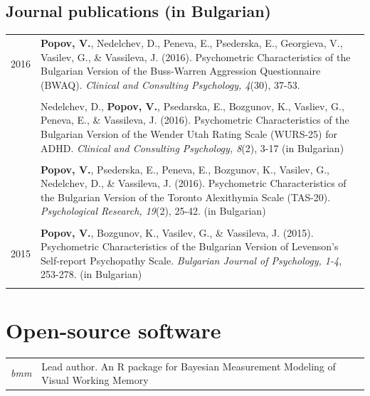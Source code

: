 \documentclass[letterpaper]{article}
\begin{document}
\subsection*{Journal publications (in Bulgarian)}
\begin{longtable}{p{0.7cm}p{15cm}}
2016 & \textbf{Popov, V.}, Nedelchev, D., Peneva, E., Psederska, E., Georgieva, V., Vasilev, G., \& Vassileva, J. (2016). Psychometric Characteristics of the Bulgarian Version of the Buss-Warren Aggression Questionnaire (BWAQ). {\it Clinical and Consulting Psychology, 4}(30), 37-53.\\[6pt]
&\\
& Nedelchev, D., \textbf{Popov, V.}, Psedarska, E., Bozgunov, K., Vasliev, G., Peneva, E., \& Vassileva, J. (2016). Psychometric Characteristics of the Bulgarian Version of the Wender Utah Rating Scale (WURS-25) for ADHD. {\it Clinical and Consulting Psychology, 8}(2), 3-17 (in Bulgarian)\\[6pt]
&\\
& \textbf{Popov, V.}, Psederska, E., Peneva, E., Bozgunov, K., Vasilev, G., Nedelchev, D., \& Vassileva, J. (2016). Psychometric Characteristics of the Bulgarian Version of the Toronto Alexithymia Scale (TAS-20). {\it Psychological Research, 19}(2), 25-42. (in Bulgarian)\\[6pt]
 &\\
2015 & \textbf{Popov, V.}, Bozgunov, K., Vasilev, G., \& Vassileva, J. (2015). Psychometric Characteristics of the Bulgarian Version of Levenson's Self-report Psychopathy Scale. {\it Bulgarian Journal of Psychology, 1-4}, 253-278.  (in Bulgarian)\\[6pt]
&\\
\end{longtable}


\section*{Open-source software}
\begin{longtable}{p{0.7cm}p{15cm}}
{\it bmm} & Lead author. An R package for Bayesian Measurement Modeling of Visual Working Memory\\	
\end{longtable}

\end{document}

